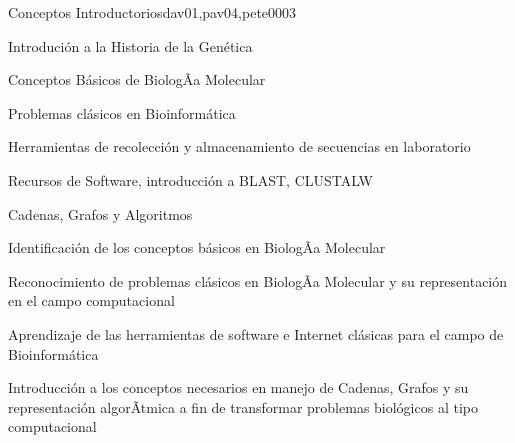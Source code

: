 \begin{syllabus}
\begin{unit}{Conceptos Introductorios}{dav01,pav04,pete00}{0}{3}
\begin{topics}
        \item Introdución a la Historia de la Genética
        \item Conceptos Básicos de BiologÃ­a Molecular
        \item Problemas clásicos en Bioinformática
        \item Herramientas de recolección y almacenamiento de secuencias en laboratorio
        \item Recursos de Software, introducción a BLAST, CLUSTALW
        \item Cadenas, Grafos y Algoritmos
    \end{topics}
    \begin{learningoutcomes}
        \item Identificación de los conceptos básicos en BiologÃ­a Molecular
        \item Reconocimiento de problemas clásicos en BiologÃ­a Molecular y su representación en el campo computacional
        \item Aprendizaje de las herramientas de software e Internet clásicas para el campo de Bioinformática
        \item Introducción a los conceptos necesarios en manejo de Cadenas, Grafos y su representación algorÃ­tmica a fin de transformar problemas biológicos al tipo computacional
    \end{learningoutcomes}
\end{unit}


\end{syllabus}
